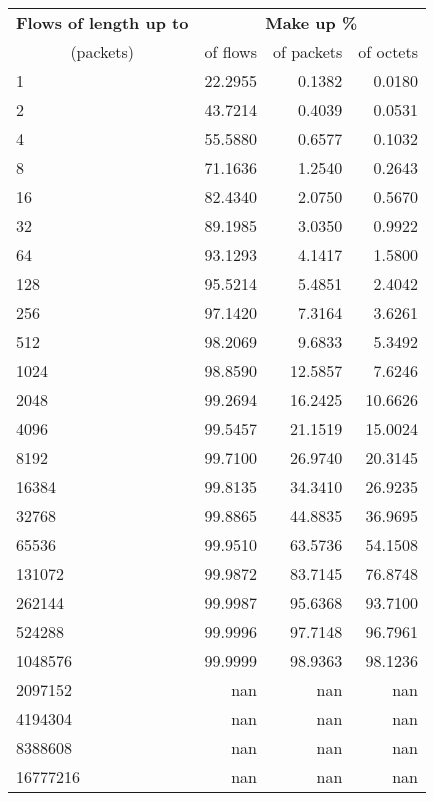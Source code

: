 \begin{tabular}{@{}lrrr@{}}
\toprule
\textbf{Flows of length up to} & \multicolumn{3}{c}{\textbf{Make up \%}} \\
\cmidrule(lr){2-4}
\multicolumn{1}{c}{(packets)} & of flows & of packets & of octets \\
\midrule
1 & 22.2955 & 0.1382 & 0.0180 \\
2 & 43.7214 & 0.4039 & 0.0531 \\
4 & 55.5880 & 0.6577 & 0.1032 \\
8 & 71.1636 & 1.2540 & 0.2643 \\
16 & 82.4340 & 2.0750 & 0.5670 \\
32 & 89.1985 & 3.0350 & 0.9922 \\
64 & 93.1293 & 4.1417 & 1.5800 \\
128 & 95.5214 & 5.4851 & 2.4042 \\
256 & 97.1420 & 7.3164 & 3.6261 \\
512 & 98.2069 & 9.6833 & 5.3492 \\
1024 & 98.8590 & 12.5857 & 7.6246 \\
2048 & 99.2694 & 16.2425 & 10.6626 \\
4096 & 99.5457 & 21.1519 & 15.0024 \\
8192 & 99.7100 & 26.9740 & 20.3145 \\
16384 & 99.8135 & 34.3410 & 26.9235 \\
32768 & 99.8865 & 44.8835 & 36.9695 \\
65536 & 99.9510 & 63.5736 & 54.1508 \\
131072 & 99.9872 & 83.7145 & 76.8748 \\
262144 & 99.9987 & 95.6368 & 93.7100 \\
524288 & 99.9996 & 97.7148 & 96.7961 \\
1048576 & 99.9999 & 98.9363 & 98.1236 \\
2097152 & nan & nan & nan \\
4194304 & nan & nan & nan \\
8388608 & nan & nan & nan \\
16777216 & nan & nan & nan \\
\bottomrule
\end{tabular}


